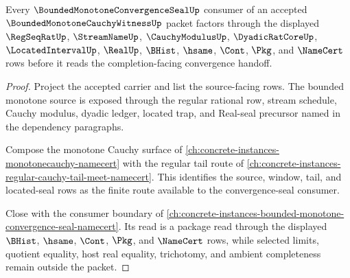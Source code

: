 \begin{theorem}
\label{thm:bounded-monotone-cauchy-witness-root-completion-source-factorization}
Every $\BoundedMonotoneConvergenceSealUp$ consumer of an accepted $\BoundedMonotoneCauchyWitnessUp$ packet factors through the displayed $\RegSeqRatUp$, $\StreamNameUp$, $\CauchyModulusUp$, $\DyadicRatCoreUp$, $\LocatedIntervalUp$, $\RealUp$, $\BHist$, $\hsame$, $\Cont$, $\Pkg$, and $\NameCert$ rows before it reads the completion-facing convergence handoff.
\end{theorem}
\begin{proof}
Project the accepted carrier and list the source-facing rows. The bounded monotone source is exposed through the regular rational row, stream schedule, Cauchy modulus, dyadic ledger, located trap, and Real-seal precursor named in the dependency paragraphs.

Compose the monotone Cauchy surface of \autoref{ch:concrete-instances-monotonecauchy-namecert} with the regular tail route of \autoref{ch:concrete-instances-regular-cauchy-tail-meet-namecert}. This identifies the source, window, tail, and located-seal rows as the finite route available to the convergence-seal consumer.

Close with the consumer boundary of \autoref{ch:concrete-instances-bounded-monotone-convergence-seal-namecert}. Its read is a package read through the displayed $\BHist$, $\hsame$, $\Cont$, $\Pkg$, and $\NameCert$ rows, while selected limits, quotient equality, host real equality, trichotomy, and ambient completeness remain outside the packet.
\end{proof}

